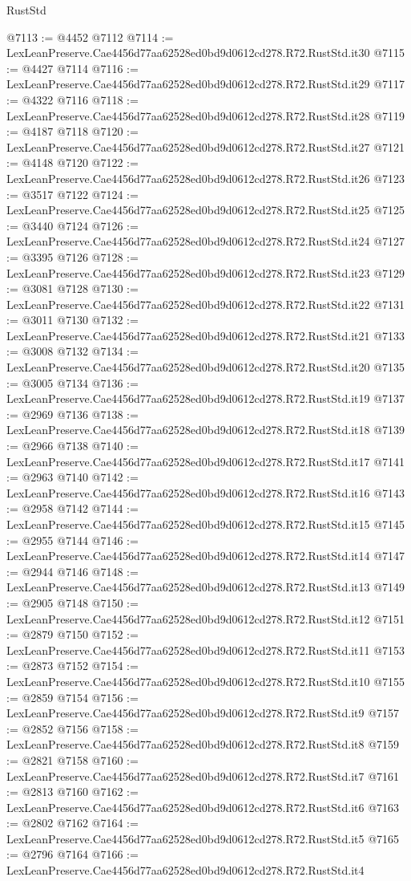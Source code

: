 \begin{lexlean}{RustStd}
\begin{coremodule}
@7113 := @4452 @7112
@7114 := LexLeanPreserve.Cae4456d77aa62528ed0bd9d0612cd278.R72.RustStd.it30
@7115 := @4427 @7114
@7116 := LexLeanPreserve.Cae4456d77aa62528ed0bd9d0612cd278.R72.RustStd.it29
@7117 := @4322 @7116
@7118 := LexLeanPreserve.Cae4456d77aa62528ed0bd9d0612cd278.R72.RustStd.it28
@7119 := @4187 @7118
@7120 := LexLeanPreserve.Cae4456d77aa62528ed0bd9d0612cd278.R72.RustStd.it27
@7121 := @4148 @7120
@7122 := LexLeanPreserve.Cae4456d77aa62528ed0bd9d0612cd278.R72.RustStd.it26
@7123 := @3517 @7122
@7124 := LexLeanPreserve.Cae4456d77aa62528ed0bd9d0612cd278.R72.RustStd.it25
@7125 := @3440 @7124
@7126 := LexLeanPreserve.Cae4456d77aa62528ed0bd9d0612cd278.R72.RustStd.it24
@7127 := @3395 @7126
@7128 := LexLeanPreserve.Cae4456d77aa62528ed0bd9d0612cd278.R72.RustStd.it23
@7129 := @3081 @7128
@7130 := LexLeanPreserve.Cae4456d77aa62528ed0bd9d0612cd278.R72.RustStd.it22
@7131 := @3011 @7130
@7132 := LexLeanPreserve.Cae4456d77aa62528ed0bd9d0612cd278.R72.RustStd.it21
@7133 := @3008 @7132
@7134 := LexLeanPreserve.Cae4456d77aa62528ed0bd9d0612cd278.R72.RustStd.it20
@7135 := @3005 @7134
@7136 := LexLeanPreserve.Cae4456d77aa62528ed0bd9d0612cd278.R72.RustStd.it19
@7137 := @2969 @7136
@7138 := LexLeanPreserve.Cae4456d77aa62528ed0bd9d0612cd278.R72.RustStd.it18
@7139 := @2966 @7138
@7140 := LexLeanPreserve.Cae4456d77aa62528ed0bd9d0612cd278.R72.RustStd.it17
@7141 := @2963 @7140
@7142 := LexLeanPreserve.Cae4456d77aa62528ed0bd9d0612cd278.R72.RustStd.it16
@7143 := @2958 @7142
@7144 := LexLeanPreserve.Cae4456d77aa62528ed0bd9d0612cd278.R72.RustStd.it15
@7145 := @2955 @7144
@7146 := LexLeanPreserve.Cae4456d77aa62528ed0bd9d0612cd278.R72.RustStd.it14
@7147 := @2944 @7146
@7148 := LexLeanPreserve.Cae4456d77aa62528ed0bd9d0612cd278.R72.RustStd.it13
@7149 := @2905 @7148
@7150 := LexLeanPreserve.Cae4456d77aa62528ed0bd9d0612cd278.R72.RustStd.it12
@7151 := @2879 @7150
@7152 := LexLeanPreserve.Cae4456d77aa62528ed0bd9d0612cd278.R72.RustStd.it11
@7153 := @2873 @7152
@7154 := LexLeanPreserve.Cae4456d77aa62528ed0bd9d0612cd278.R72.RustStd.it10
@7155 := @2859 @7154
@7156 := LexLeanPreserve.Cae4456d77aa62528ed0bd9d0612cd278.R72.RustStd.it9
@7157 := @2852 @7156
@7158 := LexLeanPreserve.Cae4456d77aa62528ed0bd9d0612cd278.R72.RustStd.it8
@7159 := @2821 @7158
@7160 := LexLeanPreserve.Cae4456d77aa62528ed0bd9d0612cd278.R72.RustStd.it7
@7161 := @2813 @7160
@7162 := LexLeanPreserve.Cae4456d77aa62528ed0bd9d0612cd278.R72.RustStd.it6
@7163 := @2802 @7162
@7164 := LexLeanPreserve.Cae4456d77aa62528ed0bd9d0612cd278.R72.RustStd.it5
@7165 := @2796 @7164
@7166 := LexLeanPreserve.Cae4456d77aa62528ed0bd9d0612cd278.R72.RustStd.it4

\end{coremodule}
\end{lexlean}
